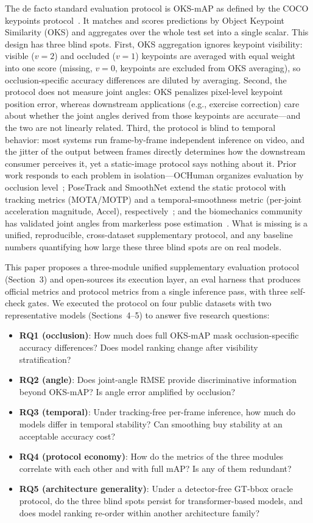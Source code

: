 \documentclass[10pt,conference]{IEEEtran}
\begin{document}
The de facto standard evaluation protocol is OKS-mAP as defined by the COCO keypoints protocol~\cite{1}. It matches and scores predictions by Object Keypoint Similarity (OKS) and aggregates over the whole test set into a single scalar. This design has three blind spots. First, OKS aggregation ignores keypoint visibility: visible ($v{=}2$) and occluded ($v{=}1$) keypoints are averaged with equal weight into one score (missing, $v{=}0$, keypoints are excluded from OKS averaging), so occlusion-specific accuracy differences are diluted by averaging. Second, the protocol does not measure joint angles: OKS penalizes pixel-level keypoint position error, whereas downstream applications (e.g., exercise correction) care about whether the joint angles derived from those keypoints are accurate---and the two are not linearly related. Third, the protocol is blind to temporal behavior: most systems run frame-by-frame independent inference on video, and the jitter of the output between frames directly determines how the downstream consumer perceives it, yet a static-image protocol says nothing about it. Prior work responds to each problem in isolation---OCHuman organizes evaluation by occlusion level~\cite{2}; PoseTrack and SmoothNet extend the static protocol with tracking metrics (MOTA/MOTP) and a temporal-smoothness metric (per-joint acceleration magnitude, Accel), respectively~\cite{3,15}; and the biomechanics community has validated joint angles from markerless pose estimation~\cite{4,5,6}. What is missing is a unified, reproducible, cross-dataset supplementary protocol, and any baseline numbers quantifying how large these three blind spots are on real models.

This paper proposes a three-module unified supplementary evaluation protocol (Section~3) and open-sources its execution layer, an eval harness that produces official metrics and protocol metrics from a single inference pass, with three self-check gates. We executed the protocol on four public datasets with two representative models (Sections~4--5) to answer five research questions:

\begin{itemize}
\item \textbf{RQ1 (occlusion)}: How much does full OKS-mAP mask occlusion-specific accuracy differences? Does model ranking change after visibility stratification?
\item \textbf{RQ2 (angle)}: Does joint-angle RMSE provide discriminative information beyond OKS-mAP? Is angle error amplified by occlusion?
\item \textbf{RQ3 (temporal)}: Under tracking-free per-frame inference, how much do models differ in temporal stability? Can smoothing buy stability at an acceptable accuracy cost?
\item \textbf{RQ4 (protocol economy)}: How do the metrics of the three modules correlate with each other and with full mAP? Is any of them redundant?
\item \textbf{RQ5 (architecture generality)}: Under a detector-free GT-bbox oracle protocol, do the three blind spots persist for transformer-based models, and does model ranking re-order within another architecture family?
\end{itemize}
\end{document}
